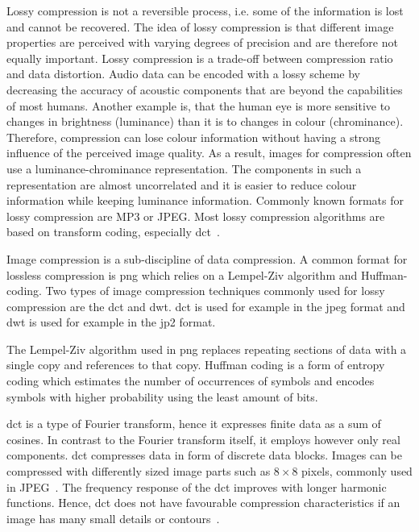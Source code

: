 Lossy compression is not a reversible process, i.e. some of the information is lost and cannot be recovered. The idea of lossy compression is that different image properties are perceived with varying degrees of precision and are therefore not equally important. Lossy compression is a trade-off between compression ratio and data distortion. Audio data can be encoded with a lossy scheme by decreasing the accuracy of acoustic components that are beyond the capabilities of most humans. Another example is, that the human eye is more sensitive to changes in brightness (luminance) than it is to changes in colour (chrominance). Therefore, compression can lose colour information without having a strong influence of the perceived image quality. As a result, images for compression often use a luminance-chrominance representation. The components in such a representation are almost uncorrelated and it is easier to reduce colour information while keeping luminance information. Commonly known formats for lossy compression are MP3 or JPEG. Most lossy compression algorithms are based on transform coding, especially \gls{dct}~\cite{Bocharova2009CompressionMultimedia}.

Image compression is a sub-discipline of data compression. A common format for lossless compression is \gls{png} which relies on a Lempel-Ziv algorithm and Huffman-coding. Two types of image compression techniques commonly used for lossy compression are the \gls{dct} and \gls{dwt}. \Gls{dct} is used for example in the \gls{jpeg} format and \gls{dwt} is used for example in the \gls{jp2} format.

The Lempel-Ziv algorithm used in \gls{png} replaces repeating sections of data with a single copy and references to that copy. Huffman coding is a form of entropy coding which estimates the number of occurrences of symbols and encodes symbols with higher probability using the least amount of bits.

\Gls{dct} is a type of Fourier transform, hence it expresses finite data as a sum of cosines. In contrast to the Fourier transform itself, it employs however only real components. \Gls{dct} compresses data in form of discrete data blocks. Images can be compressed with differently sized image parts such as $8\times8$ pixels, commonly used in JPEG~\cite{Bocharova2009CompressionMultimedia}.
The frequency response of the \gls{dct} improves with longer harmonic functions. Hence, \gls{dct} does not have favourable compression characteristics if an image has many small details or contours~\cite{Bocharova2009CompressionMultimedia}.

